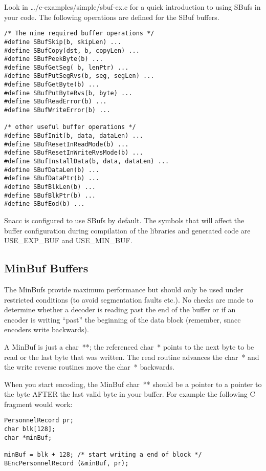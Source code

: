 Look in {\ufn \dots/c-examples/simple/sbuf-ex.c} for a quick
introduction to using {\C SBuf}s in your code. The following
operations are defined for the {\C SBuf} buffers.
\begin{verbatim}
/* The nine required buffer operations */
#define SBufSkip(b, skipLen) ...
#define SBufCopy(dst, b, copyLen) ...
#define SBufPeekByte(b) ...
#define SBufGetSeg( b, lenPtr) ...
#define SBufPutSegRvs(b, seg, segLen) ...
#define SBufGetByte(b) ...
#define SBufPutByteRvs(b, byte) ...
#define SBufReadError(b) ...
#define SBufWriteError(b) ...

/* other useful buffer operations */
#define SBufInit(b, data, dataLen) ...
#define SBufResetInReadMode(b) ...
#define SBufResetInWriteRvsMode(b) ...
#define SBufInstallData(b, data, dataLen) ...
#define SBufDataLen(b) ...
#define SBufDataPtr(b) ...
#define SBufBlkLen(b) ...
#define SBufBlkPtr(b) ...
#define SBufEod(b) ...
\end{verbatim}

Snacc is configured to use {\C SBuf}s by default.  The symbols that
will affect the buffer configuration during compilation of the
libraries and generated code are {\C USE\_EXP\_BUF} and
{\C USE\_MIN\_BUF}.

\subsection{MinBuf Buffers}

The {\C MinBuf}s provide maximum performance but should only be used under
restricted conditions (to avoid segmentation faults etc.).  No checks are
made to determine whether a decoder is reading past the end of the
buffer or if an encoder is writing ``past'' the beginning of the data
block (remember, snacc encoders write backwards).

A {\C MinBuf} is just a {\C char~**}; the referenced {\C char~*} points
to the next byte to be read or the last byte that was written. The
read routine advances the {\C char~*} and the write reverse routines
move the {\C char~*} backwards.

When you start encoding, the {\C MinBuf} {\C char~**} should be a
pointer to a pointer to the byte AFTER the last valid byte in your
buffer. For example the following C fragment would work:
\begin{verbatim}
PersonnelRecord pr;
char blk[128];
char *minBuf;

minBuf = blk + 128; /* start writing a end of block */
BEncPersonnelRecord (&minBuf, pr);
\end{verbatim}

